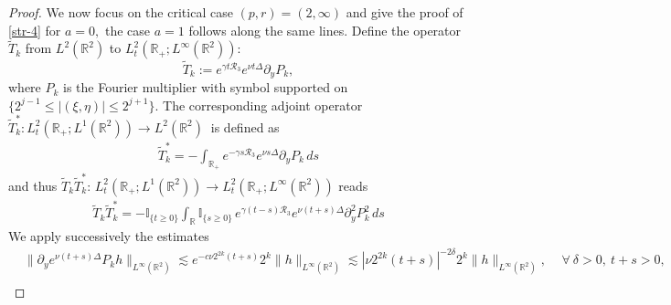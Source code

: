 \documentclass[11pt,reqno]{article}
\numberwithin{equation}{section}
\newcommand\R{{\mathbb R}}
\let\pa=\partial
\begin{document}
\begin{appendices}
\begin{proof}
We now focus on the critical case $(p,r)=(2,\infty)$ and give the proof of \eqref{str-4} 
for $a=0,$ the case $a=1$ follows along the same lines. 
Define the operator $\tilde{T}_k$ from $L^2(\R^2)$ to $L_t^2(\R_{+}; L^{\infty}(\R^2)):$
$$\tilde{T}_k:=e^{\gamma t \mathcal{R}_3} e^{\nu t\Delta}\partial_y P_k,$$
where $P_k$ is the Fourier multiplier with symbol supported on $\{2^{j-1}\leq |(\xi,\eta)|\leq 2^{j+1}\}.$
The corresponding adjoint operator $\tilde{T}_k^{*}:  L_t^{2}(\R_{+}; L^{1}(\R^2))\rightarrow L^2 (\R^2)\ $ is defined as
\begin{align*} 
\tilde{T}_k^{*}= -\int_{\mathbb{R}_{+}} e^{-\gamma s \mathcal{R}_3 }e^{\nu s\Delta}\partial_y P_k \, d s
\end{align*}
and thus $\tilde{T}_k\tilde{T}_k^{*}: \,  L_t^{2}(\R_{+}; L^{1}(\R^2))\rightarrow   L_t^{2}(\R_{+}; L^{\infty}(\R^2))$ reads
\begin{align*} 
\tilde{T}_k\tilde{T}_k^{*} = - \mathbb{I}_{\{t\geq 0\}} \int_{\mathbb{R}} \mathbb{I}_{\{s\geq 0\}} \,e^{\gamma(t- s) \mathcal{R}_3 }e^{\nu (t+s)\Delta}\partial_y^2 P_k^2 \, d s
\end{align*}
We apply successively the estimates 
\begin{align*}
&  \| \pa_y e^{\nu(t+s)\Delta}P_k h\|_{L^{\infty}(\R^2)} \lesssim e^{-c\nu 2^{2k}(t+s)}2^k\|h\|_{L^{\infty}(\R^2)}\lesssim |\nu 2^{2k}(t+s)|^{-2\delta}2^k\|h\|_{L^{\infty}(\R^2)}, \, \quad \forall~ \delta>0,~ t+s>0,\\

\end{align*}
\end{proof}
\end{appendices}
\end{document}
